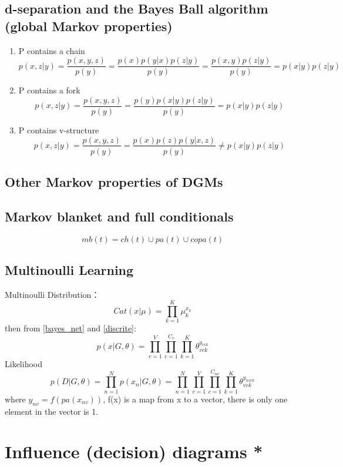 \subsection{d-separation and the Bayes Ball algorithm (global Markov properties)}
\begin{enumerate}
\item P contains a chain
\begin{equation}
p(x,z|y) = \frac{p(x,y,z)}{p(y)}
= \frac{p(x)p(y|x)p(z|y)}{p(y)}
= \frac{p(x,y)p(z|y)}{p(y)} = p(x|y)p(z|y)
\end{equation}

\item P contains a fork
\begin{equation}
p(x,z|y) = \frac{p(x,y,z)}{p(y)}
= \frac{p(y)p(x|y)p(z|y)}{p(y)}
= p(x|y)p(z|y)
\end{equation}
\item P contains v-structure
\begin{equation}
p(x,z|y) = \frac{p(x,y,z)}{p(y)}
= \frac{p(x)p(z)p(y|x,z)}{p(y)}
\neq p(x|y)p(z|y)
\end{equation}
\end{enumerate}



\subsection{Other Markov properties of DGMs}


\subsection{Markov blanket and full conditionals}

\begin{equation}
mb(t) = ch(t)\cup pa(t)\cup copa(t)
\end{equation}


\subsection{Multinoulli Learning}
Multinoulli Distribution：
\begin{equation}
Cat(x|\mu) = \prod_{k=1}^K\mu_k^{x_k}
\label{discrite}
\end{equation}
then from \ref{bayes_net} and \ref{discrite}:
\begin{equation}
p(x|G,\theta) = \prod_{v=1}^V\prod_{c=1}^{C_v}\prod_{k=1}^K
\theta_{vck}^{y_{vck}}
\end{equation}
Likelihood
\begin{equation}
p(D|G,\theta) = \prod_{n=1}^N p(x_n|G,\theta)
=\prod_{n=1}^N\prod_{v=1}^V\prod_{c=1}^{C_{nv}}\prod_{k=1}^K
\theta_{vck}^{y_{nvck}}
\end{equation}
where $y_{nv} = f(pa(x_{nv}))$, f(x) is a map from x to a vector,
there is only one element in the vector is 1.


\section{Influence (decision) diagrams *}

